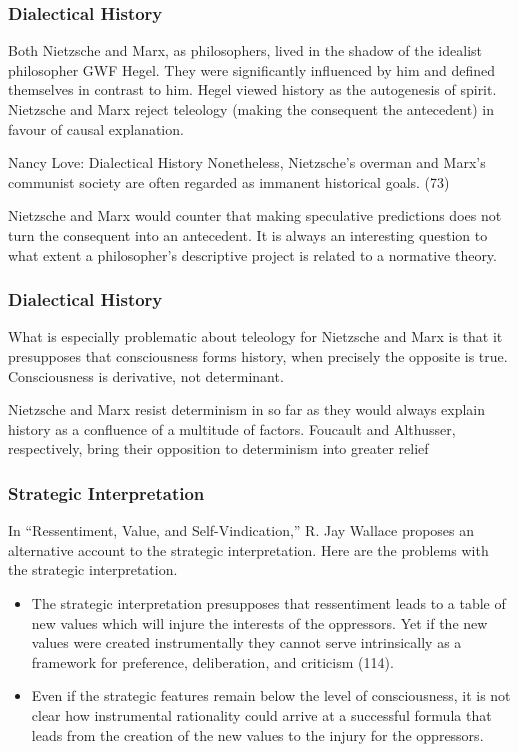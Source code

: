 \documentclass[xcolor=dvipsnames]{beamer}
\begin{document}
\begin{frame}
  \frametitle{Dialectical History}
  Both Nietzsche and Marx, as philosophers, lived in the shadow of the
  idealist philosopher GWF Hegel. They were significantly influenced
  by him and defined themselves in contrast to him. Hegel viewed
  history as the autogenesis of spirit. Nietzsche and Marx reject
  teleology (making the consequent the antecedent) in favour of causal
  explanation.
  \begin{block}{Nancy Love: Dialectical History}
    Nonetheless, Nietzsche's overman and Marx's communist society are
    often regarded as immanent historical goals. (73)
  \end{block}
  Nietzsche and Marx would counter that making speculative predictions
  does not turn the consequent into an antecedent. It is always an
  interesting question to what extent a philosopher's descriptive
  project is related to a normative theory.
\end{frame}

\begin{frame}
  \frametitle{Dialectical History}
  What is especially problematic about teleology for Nietzsche and
  Marx is that it presupposes that consciousness forms history, when
  precisely the opposite is true. Consciousness is derivative, not
  determinant.

  \bigskip

  Nietzsche and Marx resist determinism in so far as they would always
  explain history as a confluence of a multitude of factors. Foucault
  and Althusser, respectively, bring their opposition to determinism
  into greater relief
\end{frame}

\begin{frame}
  \frametitle{Strategic Interpretation}
  In ``Ressentiment, Value, and Self-Vindication,'' R. Jay Wallace proposes an alternative account to the
  \alert{strategic interpretation}. Here are the problems with the
  strategic interpretation.
  \begin{itemize}
  \item The strategic interpretation presupposes that ressentiment
    leads to a table of new values which will injure the interests of
    the oppressors. Yet if the new values were created
    \alert{instrumentally} they cannot serve \alert{intrinsically} as
    a framework for preference, deliberation, and criticism (114).
  \item Even if the strategic features remain below the level of
    consciousness, it is not clear how instrumental rationality could
    arrive at a successful formula that leads from the creation of the
    new values to the injury for the oppressors.
  \end{itemize}
\end{frame}
\end{document}

